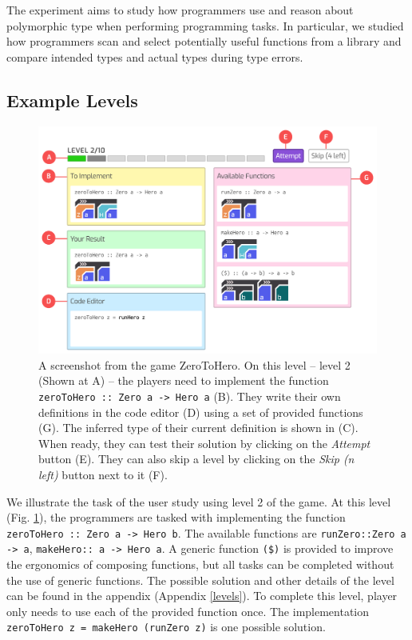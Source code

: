 \documentclass[preprint,12pt]{elsarticle}
\begin{document}
The experiment aims to study how programmers use and reason about polymorphic type when performing programming tasks. In particular, we studied how programmers scan and select potentially useful functions from a library and compare intended types and actual types during type errors.


\subsection{Example Levels}
\begin{figure}[h]
  \includegraphics[width=\linewidth]{figures/Level2}
  \caption{\label{fig:level-example} A screenshot from  the game ZeroToHero. On this level -- level 2 (Shown at A) -- the players need to implement the function \texttt{ zeroToHero :: Zero a -> Hero a} (B). They write their own definitions in the code editor (D) using a set of provided functions (G). The inferred type of their current definition is shown in (C). When ready, they can test their solution by clicking on the \textit{Attempt} button (E). They can also skip a level by clicking on the \textit{Skip (n left)} button next to it (F).}
  
\end{figure}

We illustrate the task of the user study using level 2 of the game. At this level (Fig. \ref{fig:level-example}), the programmers are tasked with implementing the function \texttt{ zeroToHero :: Zero a -> Hero b}. The available functions are \texttt{runZero::Zero a -> a}, \texttt{makeHero:: a -> Hero a}. A generic function \texttt{(\$)} is provided to improve the ergonomics of composing functions, but all tasks can be completed without the use of generic functions. The possible solution and other details of the level can be found in the appendix (Appendix \ref{levels}).
To complete this level, player only needs to use each of the provided function once. The implementation {\tt zeroToHero z = makeHero (runZero z)} is one possible solution.
\end{document}
